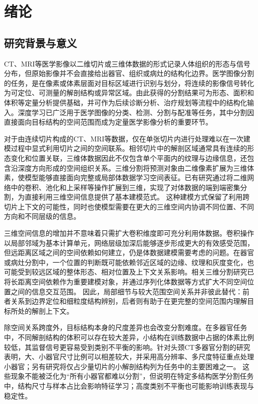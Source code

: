 \chapter{绪论}

\section{研究背景与意义}

CT、MRI等医学影像以二维切片或三维体数据的形式记录人体组织的形态与信号分布，但原始影像并不会直接给出器官、组织或病灶的结构化边界。医学图像分割的任务，是在像素或体素层面对目标区域进行识别与划分，将连续的影像信号转化为可定位、可测量的解剖结构或异常区域。由此获得的分割结果可为形态、面积和体积等定量分析提供基础，并可作为后续诊断分析、治疗规划等流程中的结构化输入。深度学习已广泛用于医学图像的分类、检测、分割与配准等任务，其中分割因直接面向目标结构的空间范围而成为定量医学影像分析的重要环节。\cite{litjens2017survey,hesamian2019segmentationreview}

对于由连续切片构成的CT、MRI等数据，仅在单张切片内进行处理难以在一次建模过程中显式利用切片之间的空间联系。相邻切片中的解剖区域通常具有连续的形态变化和位置关联，三维体数据因此不仅包含单个平面内的纹理与边缘信息，还包含沿深度方向形成的空间组织关系。三维分割将预测对象由二维像素扩展为三维体素，使模型能够直接面向完整或局部体数据学习空间表征。已有研究通过将二维网络中的卷积、池化和上采样等操作扩展到三维，实现了对体数据的端到端密集分割，为直接利用三维空间信息提供了基本建模范式。\cite{hesamian2019segmentationreview,cicek2016threeDunet} 这种建模方式保留了利用跨切片上下文的可能性，同时也使模型需要在更大的三维空间内协调不同位置、不同方向和不同层级的信息。

三维空间信息的增加并不意味着只需扩大卷积维度即可充分利用体数据。卷积操作以局部邻域为基本计算单元，网络层级加深后能够逐步形成更大的有效感受范围，但远距离区域之间的空间依赖如何建立，仍是体数据建模需要考虑的问题。在器官或病灶分割中，一个位置的判断既可能依赖邻近区域的边缘、纹理和灰度变化，也可能受到较远区域的整体形态、相对位置及上下文关系影响。相关三维分割研究已将长距离空间依赖作为重要建模对象，并通过序列化体数据等方式扩大不同空间位置之间的信息交互范围。\cite{hatamizadeh2022unetr} 因此，局部细节与较大范围空间关系并非彼此替代：前者关系到边界定位和细粒度结构辨别，后者则有助于在更完整的空间范围内理解目标所处的解剖上下文。

除空间关系跨度外，目标结构本身的尺度差异也会改变分割难度。在多器官任务中，不同解剖结构的体积可以存在较大差异，小结构在训练数据中占据的体素比例较低，其监督信号更容易受到类别不平衡的影响。针对头颈CT多器官分割的研究表明，大、小器官尺寸比例可以相差较大，并采用高分辨率、多尺度特征重点处理小器官；另有研究将仅占少量切片的小解剖结构列为任务中的主要困难之一。\cite{gao2019focusnet,zhu2019anatomynet} 这些现象不能被泛化为“所有小器官都难以分割”，但说明在特定多结构医学分割任务中，结构尺寸与样本占比会影响特征学习；高度类别不平衡也可能影响训练表现与稳定性。\cite{kervadec2021boundary}

